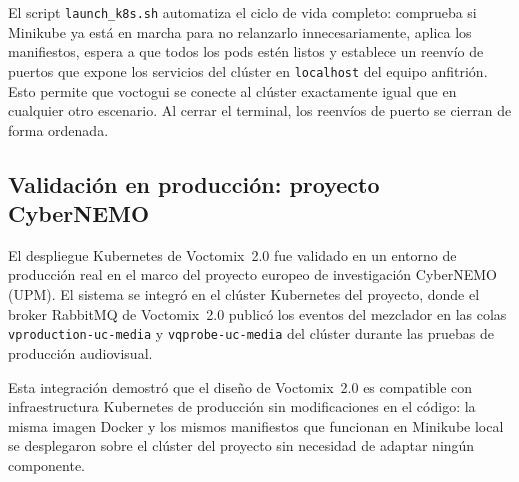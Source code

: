 El script \texttt{launch\_k8s.sh} automatiza el ciclo de vida completo: comprueba si
Minikube ya está en marcha para no relanzarlo innecesariamente, aplica los manifiestos,
espera a que todos los pods estén listos y establece un reenvío de puertos que expone
los servicios del clúster en \texttt{localhost} del equipo anfitrión. Esto permite que
voctogui se conecte al clúster exactamente igual que en cualquier otro escenario. Al
cerrar el terminal, los reenvíos de puerto se cierran de forma ordenada.

\subsection{Validación en producción: proyecto CyberNEMO}
\label{sec:cybernemo}

El despliegue Kubernetes de Voctomix~2.0 fue validado en un entorno de producción real
en el marco del proyecto europeo de investigación CyberNEMO (UPM). El sistema se integró
en el clúster Kubernetes del proyecto, donde el broker RabbitMQ de Voctomix~2.0 publicó
los eventos del mezclador en las colas \texttt{vproduction-uc-media} y
\texttt{vqprobe-uc-media} del clúster durante las pruebas de producción audiovisual.

Esta integración demostró que el diseño de Voctomix~2.0 es compatible con
infraestructura Kubernetes de producción sin modificaciones en el código: la
misma imagen Docker y los mismos manifiestos que funcionan en Minikube local se
desplegaron sobre el clúster del proyecto sin necesidad de adaptar ningún componente.
